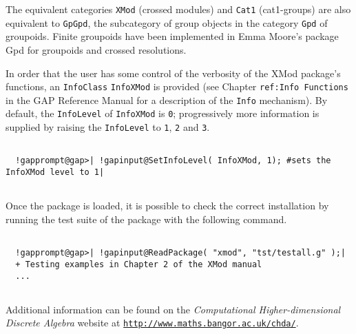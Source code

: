 \documentclass[a4paper,11pt]{report}
\begin{document}
{ The equivalent categories \texttt{XMod} (crossed modules) and \texttt{Cat1} (cat1-groups) are also equivalent to \texttt{GpGpd}, the subcategory of group objects in the category \texttt{Gpd} of groupoids. Finite groupoids have been implemented in Emma Moore's package \textsf{Gpd} \cite{M1} for groupoids and crossed resolutions. 

  In order that the user has some control of the verbosity of the \textsf{XMod} package's functions, an \texttt{InfoClass} \texttt{InfoXMod} is provided (see Chapter \texttt{ref:Info Functions} in the \textsf{GAP} Reference Manual for a description of the \texttt{Info} mechanism). By default, the \texttt{InfoLevel} of \texttt{InfoXMod} is \texttt{0}; progressively more information is supplied by raising the \texttt{InfoLevel} to \texttt{1}, \texttt{2} and \texttt{3}. 
\begin{Verbatim}[commandchars=!@|,fontsize=\small,frame=single,label=Example]
  
  !gapprompt@gap>| !gapinput@SetInfoLevel( InfoXMod, 1); #sets the InfoXMod level to 1|
  
\end{Verbatim}
 Once the package is loaded, it is possible to check the correct installation
by running the test suite of the package with the following command. 
\begin{Verbatim}[commandchars=!@|,fontsize=\small,frame=single,label=Example]
  
  !gapprompt@gap>| !gapinput@ReadPackage( "xmod", "tst/testall.g" );|
  + Testing examples in Chapter 2 of the XMod manual
  ... 
  
\end{Verbatim}
 Additional information can be found on the \emph{Computational Higher-dimensional Discrete Algebra} website at \href{http://www.maths.bangor.ac.uk/chda/} {\texttt{http://www.maths.bangor.ac.uk/chda/}}. }

            
\end{document}
